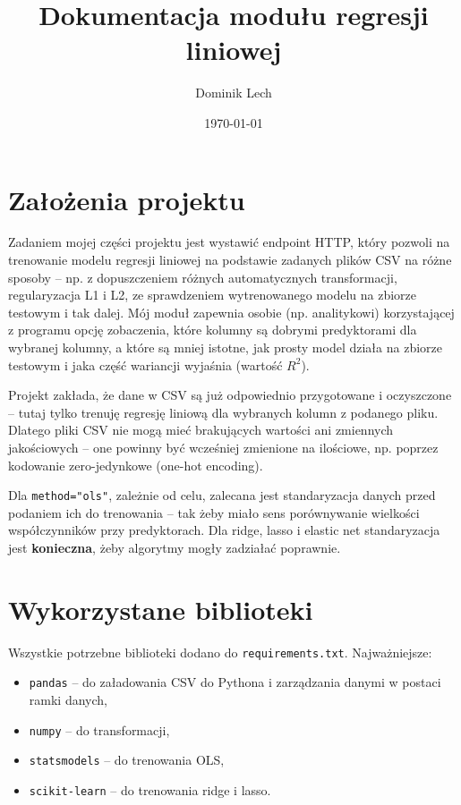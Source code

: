 \documentclass[12pt,a4paper]{article}
\title{Dokumentacja modułu regresji liniowej}
\author{Dominik Lech}
\date{\today}
\begin{document}
\maketitle

\section{Założenia projektu}
Zadaniem mojej części projektu jest wystawić endpoint HTTP, który pozwoli na trenowanie modelu regresji liniowej na podstawie zadanych plików CSV na różne sposoby – np. z dopuszczeniem różnych automatycznych transformacji, regularyzacja L1 i L2, ze sprawdzeniem wytrenowanego modelu na zbiorze testowym i tak dalej. Mój moduł zapewnia osobie (np. analitykowi) korzystającej z programu opcję zobaczenia, które kolumny są dobrymi predyktorami dla wybranej kolumny, a które są mniej istotne, jak prosty model działa na zbiorze testowym i jaka część wariancji wyjaśnia (wartość \(R^2\)).

Projekt zakłada, że dane w CSV są już odpowiednio przygotowane i oczyszczone – tutaj tylko trenuję regresję liniową dla wybranych kolumn z podanego pliku. Dlatego pliki CSV nie mogą mieć brakujących wartości ani zmiennych jakościowych – one powinny być wcześniej zmienione na ilościowe, np. poprzez kodowanie zero-jedynkowe (one-hot encoding).

Dla \texttt{method="ols"}, zależnie od celu, zalecana jest standaryzacja danych przed podaniem ich do trenowania – tak żeby miało sens porównywanie wielkości współczynników przy predyktorach. Dla ridge, lasso i elastic net standaryzacja jest \textbf{konieczna}, żeby algorytmy mogły zadziałać poprawnie.

\section{Wykorzystane biblioteki}
Wszystkie potrzebne biblioteki dodano do \texttt{requirements.txt}. Najważniejsze:

\begin{itemize}
    \item \texttt{pandas} – do załadowania CSV do Pythona i zarządzania danymi w postaci ramki danych,
    \item \texttt{numpy} – do transformacji,
    \item \texttt{statsmodels} – do trenowania OLS,
    \item \texttt{scikit-learn} – do trenowania ridge i lasso.
\end{itemize}
\end{document}
